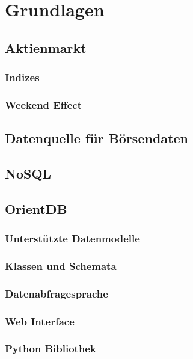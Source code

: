 \section{Grundlagen}

\subsection{Aktienmarkt}

\subsubsection{Indizes}

\subsubsection{Weekend Effect}

\subsection{Datenquelle für Börsendaten}

\subsection{NoSQL}

\subsection{OrientDB}

\subsubsection{Unterstützte Datenmodelle}

\subsubsection{Klassen und Schemata}

\subsubsection{Datenabfragesprache}

\subsubsection{Web Interface}

\subsubsection{Python Bibliothek}

\clearpage